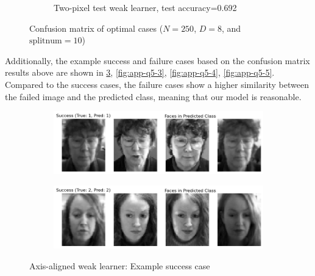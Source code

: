 \begin{figure}[htbp]
\begin{subfigure}[t]{0.4\linewidth}
		\caption{Two-pixel test weak learner, test accuracy=0.692}
		\label{fig:q5-fig8}
	\end{subfigure}
	\caption{Confusion matrix of optimal cases ($N=250$, $D=8$, and $\text{splitnum}=10$)}
	\label{fig:app-q5-6}
\end{figure}

Additionally, the example success and failure cases based on the confusion matrix results above are shown in \cref{fig:app-q5-2}, \cref{fig:app-q5-3}, \cref{fig:app-q5-4}, \cref{fig:app-q5-5}. Compared to the success cases, the failure cases show a higher similarity between the failed image and the predicted class, meaning that our model is reasonable.
\begin{figure}[htbp]
	\centering
	\begin{subfigure}{0.45\linewidth}
		\centering
		\includegraphics[width=\linewidth]{image/q5-app/q5-axis-succ1.png}
	\end{subfigure}%
	\quad
	\begin{subfigure}{0.45\linewidth}
		\centering
		\includegraphics[width=\linewidth]{image/q5-app/q5-axis-succ2.png}
	\end{subfigure}
	\caption{Axis-aligned weak learner: Example success case}
	\label{fig:app-q5-2}
\end{figure}
